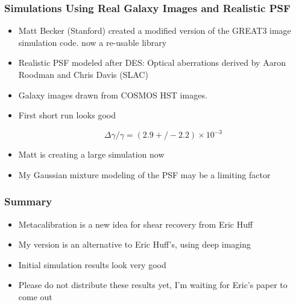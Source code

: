 \documentclass{beamer}
\begin{document}
\frame
{
    \frametitle{Simulations Using Real Galaxy Images and Realistic PSF}

 
    \begin{itemize}

        \item Matt Becker (Stanford) created a modified version of 
            the GREAT3 image simulation code. now
            a re-usable library

        \item Realistic PSF modeled after DES:  Optical aberrations derived
            by Aaron Roodman and Chris Davis (SLAC)

        \item Galaxy images drawn from COSMOS HST images.

        \item First short run looks good

            {\color{gold}
                \begin{equation}
                    \Delta \gamma/\gamma = (2.9 +/- 2.2) \times 10^{-3} \nonumber
                \end{equation}
            }
        \item Matt is creating a large simulation now

        \item My Gaussian mixture modeling of the PSF may be a limiting
            factor

    \end{itemize}

}

\frame
{
    \frametitle{Summary}

 
    \begin{itemize}
        \item Metacalibration is a new idea for shear recovery from
            Eric Huff

        \item My version is an alternative to Eric Huff's, using
            deep imaging
        
        \item Initial simulation results look very good

        \item {\color{red} Please do not distribute these results yet, I'm
            waiting for Eric's paper to come out}

    \end{itemize}

}
\end{document}
